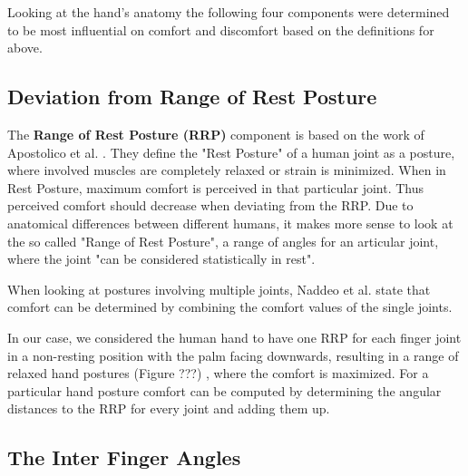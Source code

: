 Looking at the hand's anatomy the following four components were determined to be most influential on comfort and discomfort based on the definitions for above. 

\subsection{Deviation from Range of Rest Posture}

The \textbf{Range of Rest Posture (RRP)} component is based on the work of Apostolico et al. \cite{apostolico2014postural}. They define the "Rest Posture" of a human joint as a posture, where involved muscles are completely relaxed or strain is minimized. When in Rest Posture, maximum comfort is perceived in that particular joint. Thus perceived comfort should decrease when deviating from the RRP. 
Due to anatomical differences between different humans, it makes more sense to look at the so called "Range of Rest Posture", a range of angles for an articular joint, where the joint "can be considered statistically in rest".

When looking at postures involving multiple joints, Naddeo et al. \cite{naddeo2015proposal} state that comfort can be determined by combining the comfort values of the single joints.

In our case, we considered the human hand to have one RRP for each finger joint in a non-resting position with the palm facing downwards, resulting in a range of relaxed hand postures \colorbox[rgb]{1,0,0}{(Figure ???)}
, where the comfort is maximized. For a particular hand posture comfort can be computed by determining the angular distances to the RRP for every joint and adding them up.

\subsection{The Inter Finger Angles}

